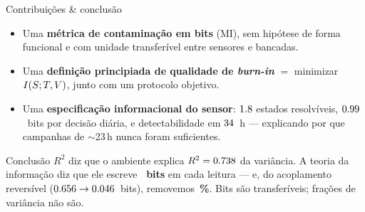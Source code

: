 \documentclass[aspectratio=169,11pt]{beamer}
\begin{document}
\guidequestion{}%
\begin{frame}{Contribuições \& conclusão}
  \begin{itemize}
    \item Uma \textbf{métrica de contaminação em bits} (MI), sem hipótese de
          forma funcional e com unidade transferível entre sensores e bancadas.
    \item Uma \textbf{definição principiada de qualidade de \emph{burn-in}} $=$
          minimizar $I\!\left(S ; T,V\right)$, junto com um protocolo
          objetivo.
    \item Uma \textbf{especificação informacional do sensor}: $1.8$
          estados resolvíveis, $0.99$~bits por decisão diária, e
          detectabilidade em $34$~h --- explicando por que
          campanhas de $\sim$23\,h nunca foram suficientes.
  \end{itemize}
  \vfill
  \begin{alertblock}{Conclusão}
    $R^2$ diz que o ambiente explica $R^2=0.738$ da variância. A
    teoria da informação diz que ele escreve \textbf{\valMIstv~bits} em
    cada leitura --- e, do acoplamento reversível
    ($0.656\to0.046$~bits), removemos
    \textbf{\valMIreductionPct\,\%}. Bits são transferíveis; frações de
    variância não são.
  \end{alertblock}
\end{frame}
\end{document}

